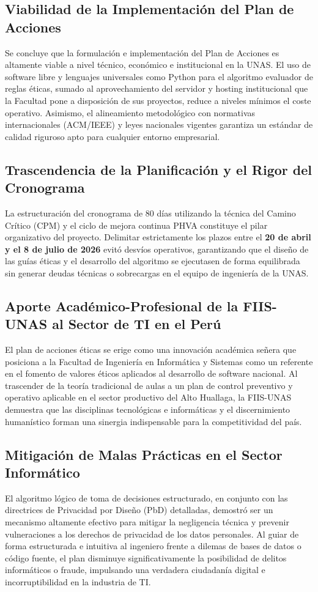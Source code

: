 \documentclass[12pt,a4paper]{article}
\begin{document}
\subsection{Viabilidad de la Implementación del Plan de Acciones}
Se concluye que la formulación e implementación del Plan de Acciones es altamente viable a nivel técnico, económico e institucional en la UNAS. El uso de software libre y lenguajes universales como Python para el algoritmo evaluador de reglas éticas, sumado al aprovechamiento del servidor y hosting institucional que la Facultad pone a disposición de sus proyectos, reduce a niveles mínimos el coste operativo. Asimismo, el alineamiento metodológico con normativas internacionales (ACM/IEEE) y leyes nacionales vigentes garantiza un estándar de calidad riguroso apto para cualquier entorno empresarial.

\subsection{Trascendencia de la Planificación y el Rigor del Cronograma}
La estructuración del cronograma de 80 días utilizando la técnica del Camino Crítico (CPM) y el ciclo de mejora continua PHVA constituye el pilar organizativo del proyecto. Delimitar estrictamente los plazos entre el \textbf{20 de abril y el 8 de julio de 2026} evitó desvíos operativos, garantizando que el diseño de las guías éticas y el desarrollo del algoritmo se ejecutasen de forma equilibrada sin generar deudas técnicas o sobrecargas en el equipo de ingeniería de la UNAS.

\subsection{Aporte Académico-Profesional de la FIIS-UNAS al Sector de TI en el Perú}
El plan de acciones éticas se erige como una innovación académica señera que posiciona a la Facultad de Ingeniería en Informática y Sistemas como un referente en el fomento de valores éticos aplicados al desarrollo de software nacional. Al trascender de la teoría tradicional de aulas a un plan de control preventivo y operativo aplicable en el sector productivo del Alto Huallaga, la FIIS-UNAS demuestra que las disciplinas tecnológicas e informáticas y el discernimiento humanístico forman una sinergia indispensable para la competitividad del país.

\subsection{Mitigación de Malas Prácticas en el Sector Informático}
El algoritmo lógico de toma de decisiones estructurado, en conjunto con las directrices de Privacidad por Diseño (PbD) detalladas, demostró ser un mecanismo altamente efectivo para mitigar la negligencia técnica y prevenir vulneraciones a los derechos de privacidad de los datos personales. Al guiar de forma estructurada e intuitiva al ingeniero frente a dilemas de bases de datos o código fuente, el plan disminuye significativamente la posibilidad de delitos informáticos o fraude, impulsando una verdadera ciudadanía digital e incorruptibilidad en la industria de TI.
\end{document}
